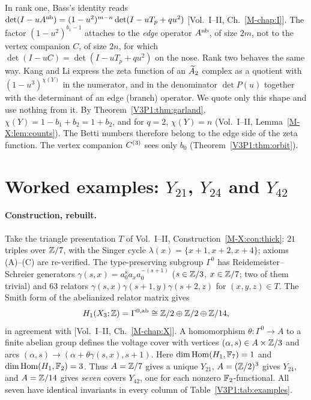 \begin{remark}\label{V3P1:rem:betti}
In rank one, Bass's identity reads
$\det(I-uA^{\mathrm{nb}})=(1-u^{2})^{m-n}\det(I-uT_p+qu^{2})$ [Vol.~I--II, Ch.~\ref{M-chap:I}]. The factor
$(1-u^{2})^{b_1-1}$ attaches to the \emph{edge} operator $A^{\mathrm{nb}}$, of size $2m$, not to the
vertex companion $C$, of size $2n$, for which $\det(I-uC)=\det(I-uT_p+qu^{2})$ on the nose.
Rank two behaves the same way. Kang and Li \cite{KL} express the zeta function of an $\widetilde A_2$
complex as a quotient with $(1-u^{3})^{\chi(Y)}$ in the numerator, and in the denominator
$\det P(u)$ together with the determinant of an edge (branch) operator. We quote only this
shape and use nothing from it. By Theorem~\ref{V3P1:thm:garland}, $\chi(Y)=1-b_1+b_2=1+b_2$,
and for $q=2$, $\chi(Y)=n$ (Vol.~I--II, Lemma~\ref{M-X:lem:counts}). The Betti numbers therefore belong to
the edge side of the zeta function. The vertex companion $C^{(3)}$ sees only $b_0$
(Theorem~\ref{V3P1:thm:orbit}).
\end{remark}

\section{Worked examples: \texorpdfstring{$Y_{21}$}{Y21}, \texorpdfstring{$Y_{24}$}{Y24} and \texorpdfstring{$Y_{42}$}{Y42}}\label{V3P1:sec:examples}

\paragraph{Construction, rebuilt.} Take the triangle presentation $T$ of
Vol.~I--II, Construction~\ref{M-X:con:thick}: $21$ triples over $\mathbb{Z}/7$, with the Singer cycle
$\lambda(x)=\{x+1,x+2,x+4\}$; axioms (A)--(C) are re-verified. The type-preserving subgroup
$\Gamma^{0}$ has Reidemeister--Schreier generators
$\gamma(s,x)=a_0^{s}a_xa_0^{-(s+1)}$ ($s\in\mathbb{Z}/3$, $x\in\mathbb{Z}/7$; two of them trivial) and $63$
relators $\gamma(s,x)\gamma(s{+}1,y)\gamma(s{+}2,z)$ for $(x,y,z)\in T$. The Smith form of the
abelianized relator matrix gives
\[
H_1(X_3;\mathbb{Z})=\Gamma^{0,\mathrm{ab}}\cong\mathbb{Z}/2\oplus\mathbb{Z}/2\oplus\mathbb{Z}/14 ,
\]
in agreement with [Vol.~I--II, Ch.~\ref{M-chap:X}]. A homomorphism $\theta\colon\Gamma^{0}\to A$ to a finite
abelian group defines the voltage cover with vertices $(\alpha,s)\in A\times\mathbb{Z}/3$ and arcs
$(\alpha,s)\to(\alpha+\theta\gamma(s,x),s+1)$. Here $\dim\operatorname{Hom}(H_1,\mathbb{F}_7)=1$ and
$\dim\operatorname{Hom}(H_1,\mathbb{F}_2)=3$. Thus $A=\mathbb{Z}/7$ gives a unique $Y_{21}$, $A=(\mathbb{Z}/2)^{3}$ gives $Y_{24}$,
and $A=\mathbb{Z}/14$ gives \emph{seven} covers $Y_{42}$, one for each nonzero $\mathbb{F}_2$-functional. All
seven have identical invariants in every column of Table~\ref{V3P1:tab:examples}.

